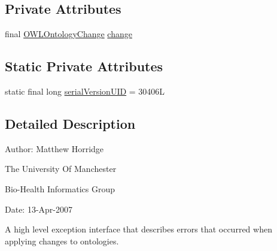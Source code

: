 \subsection*{Private Attributes}
\begin{DoxyCompactItemize}
\item 
final \hyperlink{classorg_1_1semanticweb_1_1owlapi_1_1model_1_1_o_w_l_ontology_change}{O\-W\-L\-Ontology\-Change} \hyperlink{classorg_1_1semanticweb_1_1owlapi_1_1model_1_1_o_w_l_ontology_change_exception_a9e4c14dc90fcc563956fb7207c67640a}{change}
\end{DoxyCompactItemize}
\subsection*{Static Private Attributes}
\begin{DoxyCompactItemize}
\item 
static final long \hyperlink{classorg_1_1semanticweb_1_1owlapi_1_1model_1_1_o_w_l_ontology_change_exception_a12c1022377a3c714d80eea86bec3c1e2}{serial\-Version\-U\-I\-D} = 30406\-L
\end{DoxyCompactItemize}


\subsection{Detailed Description}
Author\-: Matthew Horridge\par
 The University Of Manchester\par
 Bio-\/\-Health Informatics Group\par
 Date\-: 13-\/\-Apr-\/2007\par
\par
 A high level exception interface that describes errors that occurred when applying changes to ontologies. 

